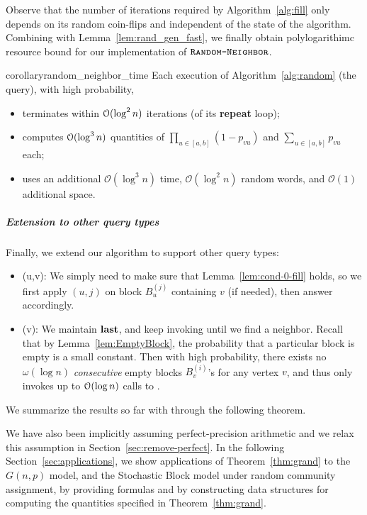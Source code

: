 Observe that the number of iterations required by Algorithm~\ref{alg:fill} only depends on its random coin-flips and independent of the state of the algorithm.
Combining with Lemma~\ref{lem:rand_gen_fast}, we finally obtain polylogarithimc resource bound for our implementation of $\texttt{\textsc{Random-Neighbor}}$.

\begin{restatable}{corollary}{random_neighbor_time}
\label{cor:random_neighbor_time}
Each execution of Algorithm~\ref{alg:random} (the  query), with high probability,
\begin{itemize}
\item terminates within $\mathcal{O}(\log^2 n)$ iterations (of its \textup{\textbf{repeat}} loop);
\item computes $\mathcal{O}(\log^3 n)$ quantities of $\prod_{u \in [a,b]} (1-p_{vu})$ and $\sum_{u\in[a,b]} p_{vu}$ each;
\item uses an additional $\mathcal O(\log^3 n)$ time, $\mathcal O(\log^2 n)$ random words, and $\mathcal O(1)$ additional space.
\end{itemize}
\end{restatable}

\subparagraph*{Extension to other query types}
Finally, we extend our algorithm to support other query types:
\begin{itemize}
\item {}(u,v): We simply need to make sure that Lemma~\ref{lem:cond-0-fill} holds, so we first apply $(u,j)$ on block $B_u^{(j)}$ containing $v$ (if needed), then answer accordingly.
\item {}(v): We maintain $\mathbf{last}$, and keep invoking  until we find a neighbor. Recall that by Lemma~\ref{lem:EmptyBlock}, the probability that a particular block is empty is a small constant. Then with high probability, there exists no $\omega(\log n)$ \emph{consecutive} empty blocks $B^{(i)}_v$'s for any vertex $v$, and thus  only invokes up to $\mathcal{O}(\log n)$ calls to .
\end{itemize}

We summarize the results so far with through the following theorem.

\UndirectedGrand*

We have also been implicitly assuming perfect-precision arithmetic and we relax this assumption in Section~\ref{sec:remove-perfect}.
In the following Section~\ref{sec:applications}, we show applications of Theorem~\ref{thm:grand} to the $G(n,p)$ model,
and the Stochastic Block model under random community assignment,
by providing formulas and by constructing data structures for computing the quantities specified in Theorem~\ref{thm:grand}.
